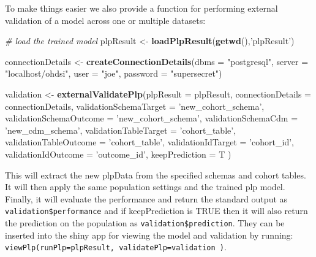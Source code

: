 \documentclass[]{article}
\newenvironment{Shaded}{\begin{snugshade}}{\end{snugshade}}
\newcommand{\KeywordTok}[1]{\textcolor[rgb]{0.13,0.29,0.53}{\textbf{#1}}}
\newcommand{\DataTypeTok}[1]{\textcolor[rgb]{0.13,0.29,0.53}{#1}}
\newcommand{\StringTok}[1]{\textcolor[rgb]{0.31,0.60,0.02}{#1}}
\newcommand{\CommentTok}[1]{\textcolor[rgb]{0.56,0.35,0.01}{\textit{#1}}}
\newcommand{\NormalTok}[1]{#1}
\begin{document}
To make things easier we also provide a function for performing external
validation of a model across one or multiple datasets:

\begin{Shaded}
\begin{Highlighting}[]
\CommentTok{# load the trained model}
\NormalTok{plpResult <-}\StringTok{ }\KeywordTok{loadPlpResult}\NormalTok{(}\KeywordTok{getwd}\NormalTok{(),}\StringTok{'plpResult'}\NormalTok{)}

\NormalTok{connectionDetails <-}\StringTok{ }\KeywordTok{createConnectionDetails}\NormalTok{(}\DataTypeTok{dbms =} \StringTok{"postgresql"}\NormalTok{, }
                                             \DataTypeTok{server =} \StringTok{"localhost/ohdsi"}\NormalTok{, }
                                             \DataTypeTok{user =} \StringTok{"joe"}\NormalTok{, }
                                             \DataTypeTok{password =} \StringTok{"supersecret"}\NormalTok{)}

\NormalTok{validation <-}\StringTok{ }\KeywordTok{externalValidatePlp}\NormalTok{(}\DataTypeTok{plpResult =}\NormalTok{ plpResult, }
                                  \DataTypeTok{connectionDetails =}\NormalTok{ connectionDetails,}
                                  \DataTypeTok{validationSchemaTarget =} \StringTok{'new_cohort_schema'}\NormalTok{,}
                                  \DataTypeTok{validationSchemaOutcome =} \StringTok{'new_cohort_schema'}\NormalTok{,}
                                  \DataTypeTok{validationSchemaCdm =} \StringTok{'new_cdm_schema'}\NormalTok{, }
                                  \DataTypeTok{validationTableTarget =} \StringTok{'cohort_table'}\NormalTok{,}
                                  \DataTypeTok{validationTableOutcome =} \StringTok{'cohort_table'}\NormalTok{, }
                                  \DataTypeTok{validationIdTarget =} \StringTok{'cohort_id'}\NormalTok{, }
                                  \DataTypeTok{validationIdOutcome =} \StringTok{'outcome_id'}\NormalTok{, }
                                  \DataTypeTok{keepPrediction =}\NormalTok{ T}
\NormalTok{                                  )}
\end{Highlighting}
\end{Shaded}

This will extract the new plpData from the specified schemas and cohort
tables. It will then apply the same population settings and the trained
plp model. Finally, it will evaluate the performance and return the
standard output as \texttt{validation\$performance} and if
keepPrediction is TRUE then it will also return the prediction on the
population as \texttt{validation\$prediction}. They can be inserted into
the shiny app for viewing the model and validation by running:
\texttt{viewPlp(runPlp=plpResult,\ validatePlp=validation\ )}.
\end{document}
